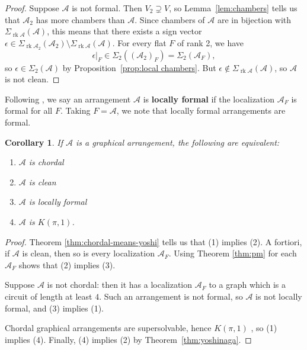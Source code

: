 \documentclass[11pt]{article}
\newtheorem{corollary}[theorem]{Corollary}
\theoremstyle{definition}
\newcommand{\<}{\left<}
\renewcommand{\>}{\right>}
\newcommand{\A}{\mathcal{A}}
\newcommand{\cA}{\mathcal{A}}
\newcommand{\rk}{\operatorname{rk}}
\begin{document}
\begin{proof}
Suppose $\A$ is not formal.  Then $V_2\supsetneq V$, so Lemma~\ref{lem:chambers} tells us that 
$\cA_2$ has more chambers than $\cA$.  Since chambers of $\cA$ are in bijection with $\Sigma_{\rk \cA}(\cA)$,
this means that there exists a sign vector $\epsilon\in\Sigma_{\rk \cA_2}(\cA_2)\setminus\Sigma_{\rk \cA}(\cA)$.
For every flat $F$ of rank 2, we have $$\epsilon|_F \in \Sigma_{2}((\cA_2)_F) = \Sigma_{2}(\cA_F),$$
so $\epsilon\in\Sigma_2(\cA)$ by Proposition~\ref{prop:local chambers}.
But $\epsilon\not\in\Sigma_{\rk \cA}(\A)$, so $\A$ is not clean.
\end{proof}
Following \cite[Def.\ 2.3]{Yuz93}, we say an arrangement $\A$ is {\bf locally
  formal} if the localization $\A_F$ is formal for all $F$.  Taking
$F=\A$, we note that locally formal arrangements are formal.
\begin{corollary}\label{cor:yoshi-typeA}
  If $\A$ is a graphical arrangement, the following are equivalent:
  \begin{enumerate}
  \item[(1)] $\cA$ is chordal
  \item[(2)] $\A$ is clean\label{eq:cor1}
    \item[(3)] $\A$ is locally formal\label{eq:cor2}
    \item[(4)] $\A$ is $K(\pi,1)$.  \label{eq:cor3}
\end{enumerate}
\end{corollary}

\begin{proof}
  Theorem \ref{thm:chordal-means-yoshi} tells us that (1) implies (2).
  A fortiori, if $\A$ is clean, then so is every localization $\A_F$.  Using
  Theorem \ref{thm:pm} for each $\A_F$ shows that (2) implies (3).

  Suppose $\A$ is not chordal: then it has a localization $\A_F$ to a graph
  which is a circuit of length at least $4$.  Such an arrangement is not
  formal, so $\A$ is not locally formal, and (3) implies (1).

Chordal graphical arrangements are supersolvable,
hence $K(\pi,1)$ \cite{FR87}, so (1) implies (4).
Finally, (4) implies (2) by Theorem~\ref{thm:yoshinaga}.
\end{proof}
\end{document}
